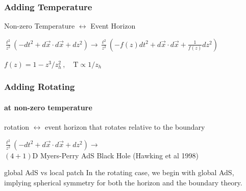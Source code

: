 \documentclass[xcolor=dvipsnames]{beamer}
\begin{document}
\begin{frame}
  \frametitle{Adding Temperature}

  \begin{block}{}Non-zero Temperature $\longleftrightarrow$ Event Horizon\end{block}

  \begin{block}{}
    $\frac {\ell^2}{z^2} \left( -dt^2 + d\vec x\cdot d\vec x + dz^2 \right) \rightarrow \frac {\ell^2}{z^2} \left( -f(z) dt^2 + d\vec x\cdot d\vec x + \frac 1{f(z)}dz^2 \right)$

    $ f(z) = 1 - z^3/z_h^2\,, \quad \mathrm T \propto 1/z_h $
  \end{block}


\end{frame}

\begin{frame}
  \frametitle{Adding Rotating}
  \framesubtitle{at non-zero temperature}

  \begin{block}{}rotation $\longleftrightarrow$ event horizon that rotates relative to the boundary\end{block}

  \begin{block}{}
    $\frac {\ell^2}{z^2} \left( -dt^2 + d\vec x\cdot d\vec x + dz^2 \right) \rightarrow$ \\$(4+1)$D Myers-Perry AdS Black Hole (Hawking et al 1998)
  \end{block}

  \begin{alertblock}{global AdS vs local patch}
    In the rotating case, we begin with global AdS, implying spherical symmetry for both the horizon and the boundary theory.
  \end{alertblock}


\end{frame}

\end{document}
